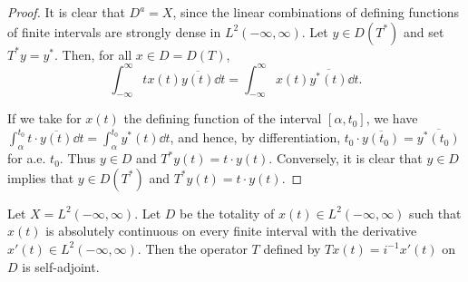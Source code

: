 \begin{proof}
 It is clear that $D^a = X$, since the linear combinations of defining functions of finite intervals are strongly dense in $L^2(-\infty, \infty)$. Let $y \in D(T^*)$ and set $T^*y = y^*$. Then, for all $x \in D = D(T)$, 
\[
\int_{- \infty} ^{\infty} t x (t) \overline {{y (t)}} \dd t = \int_{- \infty} ^{\infty} x (t) \overline {{y ^{*} (t)}} \dd t. \]

If we take for $x(t)$ the defining function of the interval $[\alpha, t_0]$, we have $\int_{\alpha}^{t_0} t \cdot \overline{y(t)} \dd t = \int_{\alpha}^{t_0} y^*(t) \dd t$, and hence, by differentiation, $t_0 \cdot \overline{y(t_0)} = \overline{y^*(t_0)}$ for a.e. $t_0$. Thus $y \in D$ and $T^* y(t) = t \cdot y(t)$. Conversely, it is clear that $y \in D$ implies that $y \in D(T^*)$ and $T^* y(t) = t \cdot y(t)$. 
\end{proof}

\begin{example}\label{ex:VII.3.Example.3} Let $X = L^{2}(-\infty, \infty)$. Let $D$ be the totality of $x(t) \in L^{2}(-\infty, \infty)$ such that $x(t)$ is absolutely continuous on every finite interval with the derivative $x'(t) \in L^{2}(-\infty, \infty)$. Then the operator $T$ defined by $Tx(t) = i^{-1}x'(t)$ on $D$ is self-adjoint. 
\end{example}


